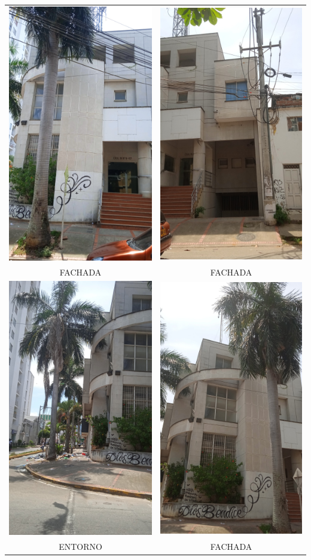 \documentclass[12pt,a4paper,twoside]{article}
\begin{document}
\begin{tabular}{ c c }
	
	\includegraphics[width = 3 cm]{Imagenes/1} & \includegraphics[width = 3 cm]{Imagenes/2} \\
	FACHADA  & FACHADA  \\
	\includegraphics[width = 3 cm]{Imagenes/3} & \includegraphics[width = 3 cm]{Imagenes/4} \\
	ENTORNO & FACHADA\\

\end{tabular}
\end{document}
